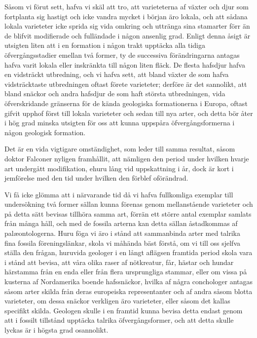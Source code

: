 Såsom vi förut sett, hafva vi skäl att tro, att varieteterna af växter och djur som fortplanta sig hastigt och icke vandra mycket i början äro lokala, och att sådana lokala varieteter icke sprida sig vida omkring och uttränga sina stamarter förr än de blifvit modifierade och fulländade i någon ansenlig grad. Enligt denna åsigt är utsigten liten att i en formation i någon trakt upptäcka alla tidiga öfvergångsstadier emellan två former, ty de successiva förändringarna antagas hafva varit lokala eller inskränkta till någon liten fläck. De flesta hafsdjur hafva en vidsträckt utbredning, och vi hafva sett, att bland växter de som hafva vidsträcktaste utbredningen oftast förete varieteter; derföre är det sannolikt, att bland snäckor och andra hafsdjur de som haft största utbredningen, vida öfverskridande gränserna för de kända geologiska formationerna i Europa, oftast gifvit upphof först till lokala varieteter och sedan till nya arter, och detta bör åter i hög grad minska utsigten för oss att kunna uppspåra öfvergångsformerna i någon geologisk formation.

Det är en vida vigtigare omständighet, som leder till samma resultat, såsom doktor Falconer nyligen framhållit, att nämligen den period under hvilken hvarje art undergått modifikation, ehuru lång vid uppskattning i år, dock är kort i jemförelse med den tid under hvilken den förblef oförändrad.

Vi få icke glömma att i närvarande tid då vi hafva fullkomliga exemplar till undersökning två former sällan kunna förenas genom mellanstående varieteter och på detta sätt bevisas tillhöra samma art, förrän ett större antal exemplar samlats från många håll, och med de fossila arterna kan detta sällan åstadkommas af palæontologerna. Huru föga vi äro i stånd att sammanbinda arter med talrika fina fossila föreningslänkar, skola vi måhända bäst förstå, om vi till oss sjelfva ställa den frågan, huruvida geologer i en långt aflägsen framtida period skola vara i stånd att bevisa, att våra olika raser af nötkreatur, får, hästar och hundar härstamma från en enda eller från flera ursprungliga stammar, eller om vissa på kusterna af Nordamerika boende hafssnäckor, hvilka af några conchologer antagas såsom arter skilda från deras europeiska representanter och af andra såsom blotta varieteter, om dessa snäckor verkligen äro varieteter, eller såsom det kallas specifikt skilda. Geologen skulle i en framtid kunna bevisa detta endast genom att i fossilt tillstånd upptäcka talrika öfvergångsformer, och att detta skulle lyckas är i högsta grad osannolikt.

